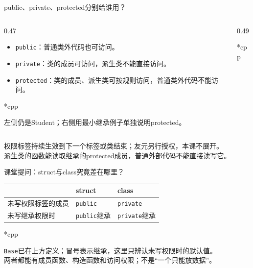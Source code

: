 \begin{frame}{public、private、protected分别给谁用？}
    \begin{columns}[T]
        \begin{column}{0.47\textwidth}
            \begin{itemize}
                \item \texttt{public}：普通类外代码也可访问。
                \item \texttt{private}：类的成员可访问，派生类不能直接访问。
                \item \texttt{protected}：类的成员、派生类可按规则访问，普通类外代码不能访问。
            \end{itemize}
            \begin{Code}*{cpp}
                
            \end{Code}
            \small 左侧仍是Student；右侧用最小继承例子单独说明protected。
        \end{column}
        \begin{column}{0.49\textwidth}
            \begin{Code}*{cpp}
                
            \end{Code}
        \end{column}
    \end{columns}
    \medskip
    \small 权限标签持续生效到下一个标签或类结束；友元另行授权，本课不展开。\\
    \alert{派生类的函数能读取继承的protected成员，普通外部代码不能直接读写它。}
\end{frame}

\begin{frame}{课堂提问：struct与class究竟差在哪里？}
    \renewcommand{\arraystretch}{1.35}
    \begin{tabular}{lll}
        & \textbf{struct} & \textbf{class}\\
        \hline
        未写权限标签的成员 & \texttt{public} & \texttt{private}\\
        未写继承权限时 & \texttt{public}继承 & \texttt{private}继承
    \end{tabular}
    \medskip
    \begin{Code}*{cpp}
        
    \end{Code}
    \small \texttt{Base}已在上方定义；冒号表示继承，这里只辨认未写权限时的默认值。\\
    \alert{两者都能有成员函数、构造函数和访问权限；不是“一个只能放数据”。}
\end{frame}

